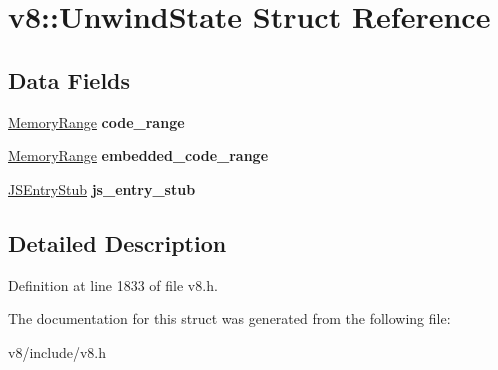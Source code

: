 \hypertarget{structv8_1_1UnwindState}{}\section{v8\+:\+:Unwind\+State Struct Reference}
\label{structv8_1_1UnwindState}
\subsection*{Data Fields}
\begin{DoxyCompactItemize}
\item 
\mbox{\label{structv8_1_1UnwindState_a6928337ceb50f5ca7ac6ea9c2b5e79c9}} 
\mbox{\hyperlink{structv8_1_1MemoryRange}{Memory\+Range}} {\bfseries code\+\_\+range}
\item 
\mbox{\label{structv8_1_1UnwindState_af491a7ed0095d588e65346d2d47aeb10}} 
\mbox{\hyperlink{structv8_1_1MemoryRange}{Memory\+Range}} {\bfseries embedded\+\_\+code\+\_\+range}
\item 
\mbox{\label{structv8_1_1UnwindState_a6524b94b4e4530111fe284ba773aad35}} 
\mbox{\hyperlink{structv8_1_1JSEntryStub}{J\+S\+Entry\+Stub}} {\bfseries js\+\_\+entry\+\_\+stub}
\end{DoxyCompactItemize}


\subsection{Detailed Description}


Definition at line 1833 of file v8.\+h.



The documentation for this struct was generated from the following file\+:\begin{DoxyCompactItemize}
\item 
v8/include/v8.\+h\end{DoxyCompactItemize}
